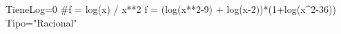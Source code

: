 \begin{sagesilent}
TieneLog=0
#f = log(x) / x**2
f = (log(x**2-9) + log(x-2))*(1+log(x^2-36))
Tipo="Racional"
\end{sagesilent}
